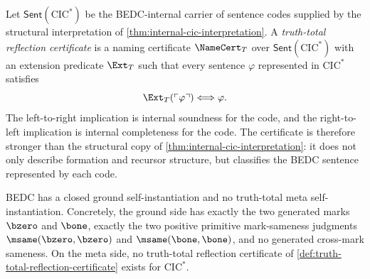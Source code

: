 \begin{definition}
\label{def:truth-total-reflection-certificate}
Let $\mathsf{Sent}(\mathrm{CIC}^{*})$ be the BEDC-internal carrier of sentence codes supplied by the structural interpretation of \autoref{thm:internal-cic-interpretation}. A \emph{truth-total reflection certificate} is a naming certificate $\NameCert_T$ over $\mathsf{Sent}(\mathrm{CIC}^{*})$ with an extension predicate $\Ext_T$ such that every sentence $\varphi$ represented in $\mathrm{CIC}^{*}$ satisfies
$$
\Ext_T(\ulcorner\varphi\urcorner)\Longleftrightarrow \varphi.
$$
The left-to-right implication is internal soundness for the code, and the right-to-left implication is internal completeness for the code. The certificate is therefore stronger than the structural copy of \autoref{thm:internal-cic-interpretation}: it does not only describe formation and recursor structure, but classifies the BEDC sentence represented by each code.
\end{definition}

\begin{theorem}
\label{thm:reflection-boundary-exact}
BEDC has a closed ground self-instantiation and no truth-total meta self-instantiation. Concretely, the ground side has exactly the two generated marks $\bzero$ and $\bone$, exactly the two positive primitive mark-sameness judgments $\msame(\bzero,\bzero)$ and $\msame(\bone,\bone)$, and no generated cross-mark sameness. On the meta side, no truth-total reflection certificate of \autoref{def:truth-total-reflection-certificate} exists for $\mathrm{CIC}^{*}$.
\end{theorem}

